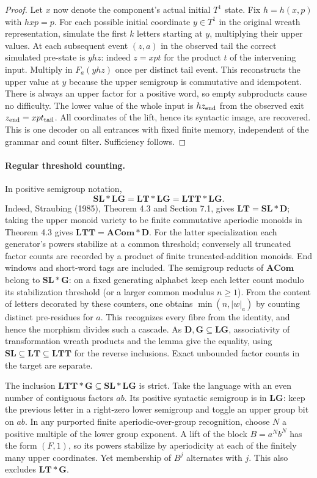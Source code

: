 \documentclass[11pt]{article}
\newcommand{\rdSL}{\mathbf{SL}}
\newcommand{\rdLG}{\mathbf{LG}}
\begin{document}
\begin{proof}
Let $x$ now denote the component's actual initial $T^1$ state. Fix
$h=h(x,p)$ with $hxp=p$. For each possible initial coordinate $y\in T^1$
in the original wreath representation, simulate the first $k$ letters
starting at $y$, multiplying their upper values. At each subsequent event
$(z,a)$ in the observed tail the correct simulated pre-state is $yhz$:
indeed $z=xpt$ for the product $t$ of the intervening input.
Multiply in $F_a(yhz)$ once per distinct tail event. This reconstructs the
upper value at $y$ because the upper semigroup is commutative and idempotent.
There is always an upper factor for a positive word, so empty subproducts
cause no difficulty. The lower value of the whole input is $hz_{\rm end}$
from the observed exit $z_{\rm end}=xpt_{\rm tail}$. All coordinates of
the lift, hence its syntactic image, are recovered. This is one decoder on
all entrances with fixed finite memory, independent of the grammar and
count filter. Sufficiency follows.
\end{proof}

\paragraph{Regular threshold counting.}
In positive semigroup notation,
\[
 \rdSL*\rdLG=\mathbf{LT}*\rdLG=\mathbf{LTT}*\rdLG .
\]
Indeed, Straubing (1985), Theorem 4.3 and Section 7.1, gives
$\mathbf{LT}=\rdSL*\mathbf D$; taking the upper monoid variety to
be finite commutative aperiodic monoids in Theorem 4.3 gives
$\mathbf{LTT}=\mathbf{ACom}*\mathbf D$.
For the latter specialization each generator's powers stabilize at a
common threshold; conversely all truncated factor counts are recorded
by a product of finite truncated-addition monoids. End windows and
short-word tags are included. The semigroup reducts of
$\mathbf{ACom}$ belong to $\rdSL*\mathbf G$: on a fixed generating
alphabet keep each letter count modulo its stabilization threshold
(or a larger common modulus $n\ge1$). From the content of letters
decorated by these counters, one obtains $\min(n,|w|_a)$ by counting
distinct pre-residues for $a$. This recognizes every fibre from the
identity, and hence the morphism divides such a cascade. As
$\mathbf D,\mathbf G\subseteq\rdLG$, associativity of transformation
wreath products and the lemma give the equality, using
$\rdSL\subseteq\mathbf{LT}\subseteq\mathbf{LTT}$ for the reverse
inclusions. Exact unbounded factor counts in the target are separate.

The inclusion $\mathbf{LTT}*\mathbf G\subseteq\rdSL*\rdLG$ is strict.
Take the language with an even number of contiguous factors $ab$.
Its positive syntactic semigroup is in $\rdLG$: keep the previous letter
in a right-zero lower semigroup and toggle an upper group bit on $ab$.
In any purported finite aperiodic-over-group recognition, choose $N$ a
positive multiple of the lower group exponent. A lift of the block
$B=a^N b^N$ has the form $(F,1)$, so its powers stabilize by aperiodicity
at each of the finitely many upper coordinates. Yet membership of $B^j$
alternates with $j$. This also excludes $\mathbf{LT}*\mathbf G$.
\end{document}
